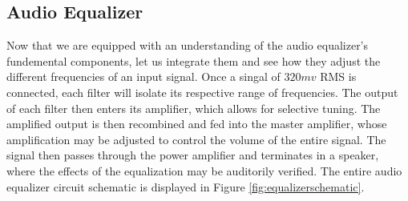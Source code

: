 \documentclass[notitlepage, 12pt]{report}
\begin{document}
\subsection*{Audio Equalizer}
Now that we are equipped with an understanding of the audio equalizer's 
fundemental components, let us integrate them and see how they adjust 
the different frequencies of an input signal. Once a singal of $320 mv$ RMS is 
connected, each filter will isolate its respective range of frequencies. 
The output of each filter then enters its amplifier, which allows for selective 
tuning. The amplified output is then recombined and fed into the master 
amplifier, whose amplification may be adjusted to control the volume of the entire signal. 
The signal then passes through the power amplifier and terminates in a speaker, where 
the effects of the equalization may be auditorily verified.  
The entire audio equalizer circuit schematic is displayed in Figure \ref{fig:equalizerschematic}. 
\end{document}

